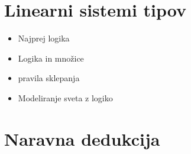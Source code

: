 \documentclass[12pt, titlepage, a4paper]{article}
\begin{document}
\section{Linearni sistemi tipov}

\begin{itemize}
    \item Najprej logika
    \item Logika in množice
    \item pravila sklepanja
    \item Modeliranje sveta z logiko
\end{itemize}


\section{Naravna dedukcija}
\end{document}
